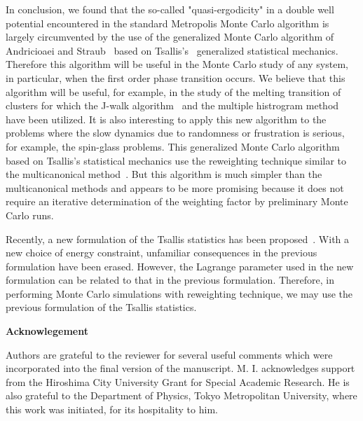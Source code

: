 In conclusion, we found that the so-called "quasi-ergodicity" 
in a double well potential encountered in the standard Metropolis 
Monte Carlo algorithm is largely circumvented by the
use of the generalized Monte Carlo algorithm of Andricioaei 
and Straub~\cite{AS2,AS3} based on Tsallis's~\cite{TS} generalized
statistical mechanics. Therefore this algorithm will be useful 
in the Monte Carlo study of any system, in particular, when
the first order phase transition occurs. We believe that
this algorithm will be useful, for example, in the study of 
the melting transition of clusters for which the J-walk
algorithm~\cite{FFD} and the multiple histrogram 
method~\cite{WA} have been utilized. It is also interesting
to apply this new algorithm to the problems where the slow
dynamics due to randomness or frustration is serious, for 
example, the spin-glass problems.  This generalized 
Monte Carlo algorithm based on Tsallis's statistical mechanics 
use the reweighting technique similar to the multicanonical 
method~\cite{BN}.  But this algorithm is much simpler than 
the multicanonical methods and appears to be more promising 
because it does not require an iterative determination of the
weighting factor by preliminary Monte Carlo runs.

Recently, a new formulation of the Tsallis statistics 
has been proposed~\cite{TMP}.  With a new choice of energy 
constraint, unfamiliar consequences in the previous formulation 
have been erased.  However, the Lagrange parameter used 
in the new formulation can be related to that in the previous 
formulation. Therefore, in performing Monte Carlo simulations 
with reweighting technique, we may use the previous formulation 
of the Tsallis statistics.


\begin{flushleft}
{\Large \bf Acknowlegement}
\end{flushleft}

Authors are grateful to the reviewer for several useful comments 
which were incorporated into the final version of the manuscript.
M. I. acknowledges support from the Hiroshima City University 
Grant for Special Academic Research. He is also grateful 
to the Department of Physics, Tokyo Metropolitan University,
where this work was initiated, for its hospitality to him.  


